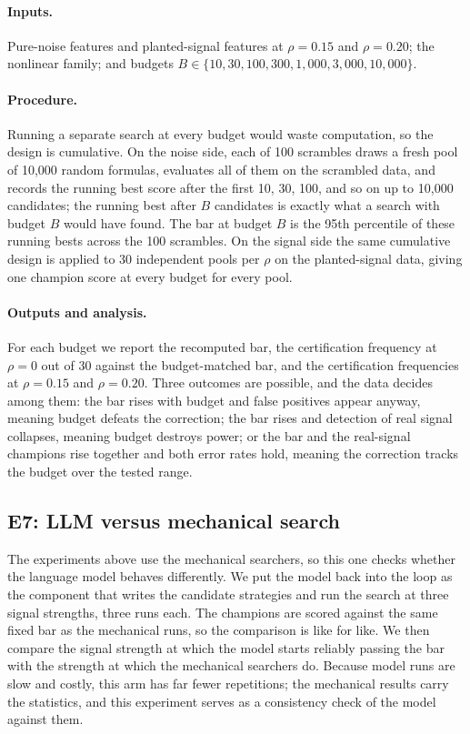 \documentclass[11pt]{article}
\begin{document}
\paragraph{Inputs.} Pure-noise features and planted-signal features at $\rho=0.15$ and $\rho=0.20$; the
nonlinear family; and budgets $B \in \{10, 30, 100, 300, 1{,}000, 3{,}000, 10{,}000\}$.

\paragraph{Procedure.} Running a separate search at every budget would waste computation, so the design
is cumulative. On the noise side, each of 100 scrambles draws a fresh pool of 10{,}000 random formulas,
evaluates all of them on the scrambled data, and records the running best score after the first 10, 30,
100, and so on up to 10{,}000 candidates; the running best after $B$ candidates is exactly what a search
with budget $B$ would have found. The bar at budget $B$ is the 95th percentile of these running bests
across the 100 scrambles. On the signal side the same cumulative design is applied to 30 independent
pools per $\rho$ on the planted-signal data, giving one champion score at every budget for every pool.

\paragraph{Outputs and analysis.} For each budget we report the recomputed bar, the certification
frequency at $\rho=0$ out of 30 against the budget-matched bar, and the certification frequencies at
$\rho=0.15$ and $\rho=0.20$. Three outcomes are possible, and the data decides among them: the bar rises
with budget and false positives appear anyway, meaning budget defeats the correction; the bar rises and
detection of real signal collapses, meaning budget destroys power; or the bar and the real-signal
champions rise together and both error rates hold, meaning the correction tracks the budget over the
tested range.

\subsection{E7: LLM versus mechanical search}

The experiments above use the mechanical searchers, so
this one checks whether the language model behaves differently. We put the model back into the loop as
the component that writes the candidate strategies and run the search at three signal strengths, three
runs each. The champions are scored against the same fixed bar as the mechanical runs, so the comparison
is like for like. We then compare the signal strength at which the model starts reliably passing the bar
with the strength at which the mechanical searchers do. Because model runs are slow and costly, this arm
has far fewer repetitions; the mechanical results carry the statistics, and this experiment serves as a
consistency check of the model against them.
\end{document}
